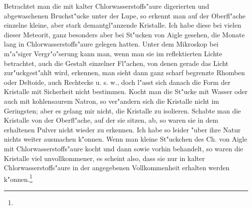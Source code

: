 \documentclass[a4paper, 11pt, oneside]{article}
\begin{document}
Betrachtet man die mit kalter Chlorwasserstoffs"aure digerierten und abgewaschenen Bruchst"ucke unter der Lupe, so erkennt man auf der Oberfl"ache einzelne kleine, aber stark demantgl"anzende Kristalle. Ich habe diese bei vielen dieser Meteorit, ganz besonders aber bei St"ucken von Aigle gesehen, die Monate lang in Chlorwasserstoffs"aure gelegen hatten. Unter dem Mikroskop bei m"a"siger Vergr"o"serung kann man, wenn man sie im reflektierten Lichte betrachtet, auch die Gestalt einzelner Fl"achen, von denen gerade das Licht zur"uckgest"ahlt wird, erkennen, man sieht dann ganz scharf begrenzte Rhomben oder Deltoide, auch Rechtecke u. s. w., doch l"asst sich danach die Form der Kristalle mit Sicherheit nicht bestimmen. Kocht man die St"ucke mit Wasser oder auch mit kohlensaurem Natron, so ver"andern sich die Kristalle nicht im Geringsten; aber es gelang mir nicht, die Kristalle zu isolieren. Schabte man die Kristalle von der Oberfl"ache, auf der sie sitzen, ab, so waren sie in dem erhaltenen Pulver nicht wieder zu erkennen. Ich habe so leider "uber ihre Natur nichts weiter ausmachen k"onnen. Wenn man kleine St"uckchen des Ch. von Aigle mit Chlorwasserstoffs"aure kocht und dann sowie vorhin behandelt, so waren die Kristalle viel unvollkommener, es scheint also, dass sie nur in kalter Chlorwasserstoffs"aure in der angegebenen Vollkommenheit erhalten werden k"onnen.\footnote{}
\end{document}
